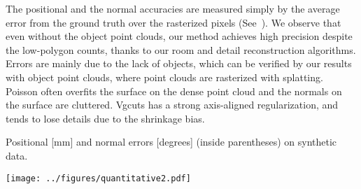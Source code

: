 The positional and the normal accuracies are measured simply by the
average error from the ground truth over the rasterized pixels
(See~). We observe that even without the object
point clouds, our method achieves high precision despite the low-polygon
counts, thanks to our room and detail reconstruction algorithms.
Errors are mainly due to the lack of objects, which can be verified by
our results with object point clouds, where point clouds are rasterized
with splatting. Poisson often overfits the surface on the dense point
cloud and the normals on the surface are cluttered. Vgcuts has a strong
axis-aligned regularization, and tends to lose details due to the
shrinkage bias.
\begin{table}[!t]
\caption{Positional [mm] and normal errors [degrees] (inside
 parentheses) on synthetic data.}
\begin{center}
 \vspace{-0.5cm} 
\texttt{[image: ../figures/quantitative2.pdf]}
\end{center}
\label{table:quantitative}
 \vspace{-0.3cm}
\end{table}


%
%



